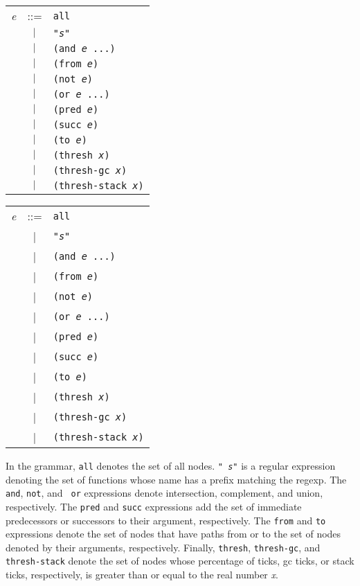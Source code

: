 \begin{latexonly}
\begin{center}
\begin{tabular}{lcl}
{\it e} & ::= & {\tt all} \\
& $\ |\ $ & {\tt "{\it s}"} \\
& $\ |\ $ & {\tt (and {\it e} ...)} \\
& $\ |\ $ & {\tt (from {\it e})} \\
& $\ |\ $ & {\tt (not {\it e})} \\
& $\ |\ $ & {\tt (or {\it e} ...)} \\
& $\ |\ $ & {\tt (pred {\it e})} \\
& $\ |\ $ & {\tt (succ {\it e})} \\
& $\ |\ $ & {\tt (to {\it e})} \\
& $\ |\ $ & {\tt (thresh {\it x})} \\
& $\ |\ $ & {\tt (thresh-gc {\it x})} \\
& $\ |\ $ & {\tt (thresh-stack {\it x})} \\
\end{tabular}
\end{center}
\end{latexonly}
\begin{htmlonly}
\begin{center}
\begin{tabular}{lcl}
{\it e} & ::= & {\tt all} \\
& | & {\tt "{\it s}"} \\
& | & {\tt (and {\it e} ...)} \\
& | & {\tt (from {\it e})} \\
& | & {\tt (not {\it e})} \\
& | & {\tt (or {\it e} ...)} \\
& | & {\tt (pred {\it e})} \\
& | & {\tt (succ {\it e})} \\
& | & {\tt (to {\it e})} \\
& | & {\tt (thresh {\it x})} \\
& | & {\tt (thresh-gc {\it x})} \\
& | & {\tt (thresh-stack {\it x})} \\
\end{tabular}
\end{center}
\end{htmlonly}

In the grammar, {\tt all} denotes the set of all nodes.  {\tt "{\it
s}"} is a regular expression denoting the set of functions whose name
has a prefix matching the regexp.  The {\tt and}, {\tt not}, and {\tt
or} expressions denote intersection, complement, and union,
respectively.  The {\tt pred} and {\tt succ} expressions add the set
of immediate predecessors or successors to their argument,
respectively.  The {\tt from} and {\tt to} expressions denote the set
of nodes that have paths from or to the set of nodes denoted by their
arguments, respectively.  Finally, {\tt thresh}, {\tt thresh-gc}, and
{\tt thresh-stack} denote the set of nodes whose percentage of ticks,
gc ticks, or stack ticks, respectively, is greater than or equal to
the real number {\it x}.


